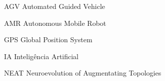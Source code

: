 \begin{siglas}
    \item[AGV] Automated Guided Vehicle
    \item[AMR] Autonomous Mobile Robot
    \item[GPS] Global Position System
    \item[IA] Intelig{\^e}ncia Artificial
    \item[NEAT] Neuroevolution of Augmentating Topologies
\end{siglas}
